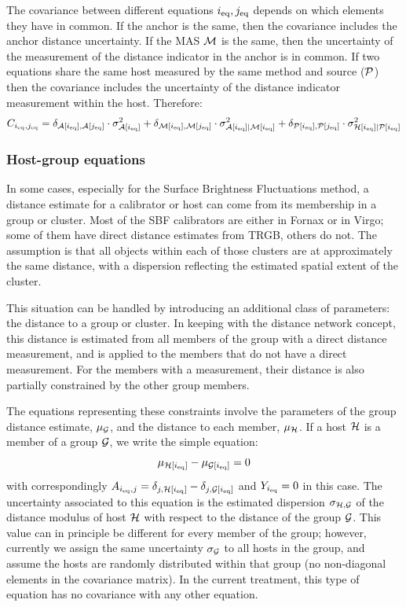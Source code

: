 The covariance between different equations $ {i_{\rm eq}}, {j_{\rm eq}} $ depends on which elements they have in common. If the anchor is the same, then the covariance includes the anchor distance uncertainty. If the MAS $\imas$ is the same, then the uncertainty of the measurement of the distance indicator in the anchor is in common. If two equations share the same host measured by the same method and source ($\ihms$) then the covariance includes the uncertainty of the distance indicator measurement within the host. Therefore:
\begin{equation}
    C_{\ieq, \jeq} = \delta_{\ianchor[\ieq], \ianchor[\jeq]} \cdot  \sigma_{\ianchor[\ieq]}^2 + \delta_{\imas[\ieq], \imas[\jeq]} \cdot \sigma_{\ianchor[\ieq]| \imas[\ieq]}^2 + \delta_{\ihms[\ieq], \ihms[\jeq]} \cdot  \sigma_{\ihost[\ieq]| \ihms[\ieq]}^2 
\end{equation}


\subsubsection {Host-group equations}
\label {sec:eq_groups}

In some cases, especially for the Surface Brightness Fluctuations method, a distance estimate for a calibrator or host can come from its membership in a group or cluster.  Most of the SBF calibrators are either in Fornax or in Virgo; some of them have direct distance estimates from TRGB, others do not.  The assumption is that all objects within each of those clusters are at approximately the same distance, with a dispersion reflecting the estimated spatial extent of the cluster.

This situation can be handled by introducing an additional class of parameters: the distance to a group or cluster.  In keeping with the distance network concept, this distance is estimated from all members of the group with a direct distance measurement, and is applied to the members that do not have a direct measurement.  For the members with a measurement, their distance is also partially constrained by the other group members.  

The equations representing these constraints involve the parameters of the group distance estimate, $ \mu_\igroup  $, and the distance to each member, $ \mu_\ihost $.  If a host $ \ihost $ is a member of a group $ \igroup$, we write the simple equation:
\begin{equation}
\mu_{\ihost[\ieq]} - \mu_{\igroup[\ieq]} = 0
\end {equation}
with correspondingly $A_{\ieq, j} = \delta_{j, \ihost[\ieq]} - \delta_{j,\igroup[\ieq]}$ and $Y_{i_{\rm eq}}=0$ in this case.  The uncertainty associated to this equation is the estimated dispersion $ \sigma_{\ihost, \igroup} $ of the distance modulus of host $ \ihost $ with respect to the distance of the group $ \igroup $. This value can in principle be different for every member of the group; however, currently we assign the same uncertainty $\sigma_\igroup$ to all hosts in the group, and assume the hosts are randomly distributed within that group (no non-diagonal elements in the covariance matrix).  In the current treatment, this type of equation has no covariance with any other equation.


